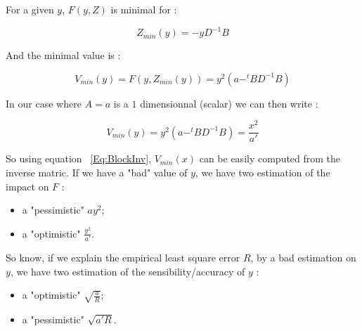 For a given $y$, $F(y,Z)$ is minimal for :

\begin{equation}
Z_{min}(y) = -y  D^{-1} B
\end{equation}

And the minimal value is :

\begin{equation}
V_{min}(y) = F(y,Z_{min}(y)) =  y^2 (a- ^t B D^{-1} B)
\end{equation}


In our  case where $A=a$ is a $1$ dimensionnal (scalar) we can then write :

\begin{equation}
V_{min}(y) =   y^2 (a- ^t B D^{-1} B) = \frac{x^2}{a'}
\end{equation}

So using equation ~\ref{Eq:BlockInv}, $V_{min}(x)$ can be easily computed  from the inverse matric. If
we have a "bad" value of $y$, we have two estimation of the impact
on  $F$ :

\begin{itemize}
   \item a "pessimistic" $a y^2$;
   \item a "optimistic" $\frac{y^2}{a'}$.
\end{itemize}

So know, if we explain the empirical least square error $R$, by
a bad estimation on $y$, we have two estimation of the sensibility/accuracy of $y$ :


\begin{itemize}
   \item a "optimistic"   $\sqrt{\frac{a}{R}}$;
   \item a "pessimistic"  $\sqrt{a'R}$.
\end{itemize}














